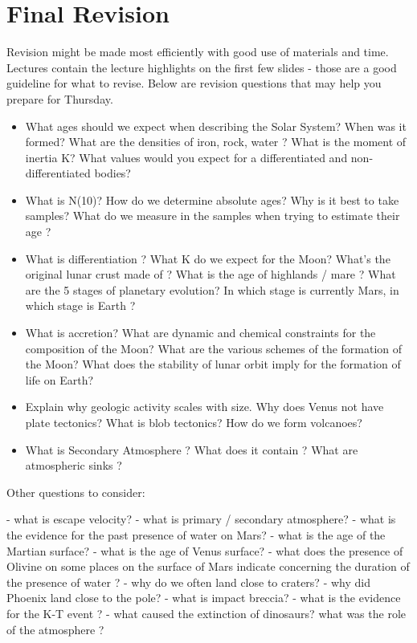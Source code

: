 \documentclass[paper=a4, fontsize=11pt]{scrartcl} %
\numberwithin{equation}{section} %
\begin{document}

\section{Final Revision  }

Revision might be made most efficiently with good use of materials and time. Lectures contain the lecture highlights on the first few slides - those are a good guideline for what to revise.  Below are revision questions that may help you prepare for Thursday.

\begin{itemize}
\item What ages should we expect when describing the Solar System? When was it formed? What are the densities of iron, rock, water ? What is the moment of inertia K? What values would you expect for a differentiated and non-differentiated bodies? 
\item What is N(10)?   How do we determine absolute ages? Why is it best to take samples? What do we measure in the samples when trying to estimate their age ? 
\item What is differentiation ?  What K do we expect for the Moon?  What's the original lunar crust made of ? What is the age of highlands  / mare ? What are the 5 stages of planetary evolution? In which stage is currently Mars, in which stage is Earth ?  
\item  What is accretion? What are dynamic and chemical constraints for the composition of the Moon? What are the various schemes of the formation of the Moon? What does the stability of lunar orbit imply for the formation of life on Earth?  
\item Explain why geologic activity scales with size. Why does Venus not have plate tectonics? What is blob tectonics? How do we form volcanoes? 

\item What is Secondary Atmosphere ? What does it contain ? What are atmospheric sinks ? 

\end{itemize}

Other questions to consider:

- what is escape velocity?  
- what is primary  / secondary atmosphere? 
- what is the evidence for the past presence of water on Mars? 
- what is the age of the Martian surface?
- what is the age of Venus surface? 
- what does the presence of Olivine on some places on the surface of Mars indicate concerning the duration of the presence of water ?  
- why do we often  land close to craters?
- why did Phoenix land close to the pole? 
-  what is impact breccia?
- what is the evidence for the K-T event ? 
- what caused the extinction of dinosaurs? what was the role of the atmosphere ? 
\end{document}
